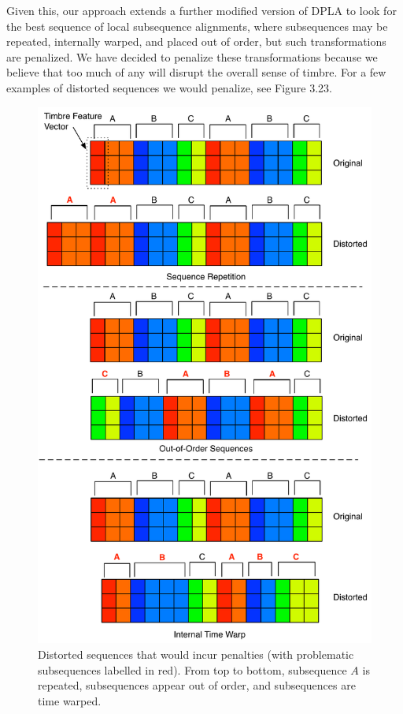 \documentclass[a4paper,12pt]{report} 	%
\numberwithin{figure}{chapter}
\numberwithin{table}{chapter}
\numberwithin{equation}{chapter}
\begin{document}
\begin{flushleft}
Given this, our approach extends a further modified version of DPLA to look for the best sequence of local subsequence alignments, where subsequences may be repeated, internally warped, and placed out of order, but such transformations are penalized. We have decided to penalize these transformations because we believe that too much of any will disrupt the overall sense of timbre. For a few examples of distorted sequences we would penalize, see Figure 3.23.
\begin{figure}[!p]
\begin{center}
\includegraphics[scale = 0.6]{SequencePenalties}
\caption[Proposed Sequence Similarity Penalties]{Distorted sequences that would incur penalties (with problematic subsequences labelled in red). From top to bottom, subsequence $A$ is repeated, subsequences appear out of order, and subsequences are time warped.}

\end{center}
\end{figure}
\end{flushleft}
\end{document}

